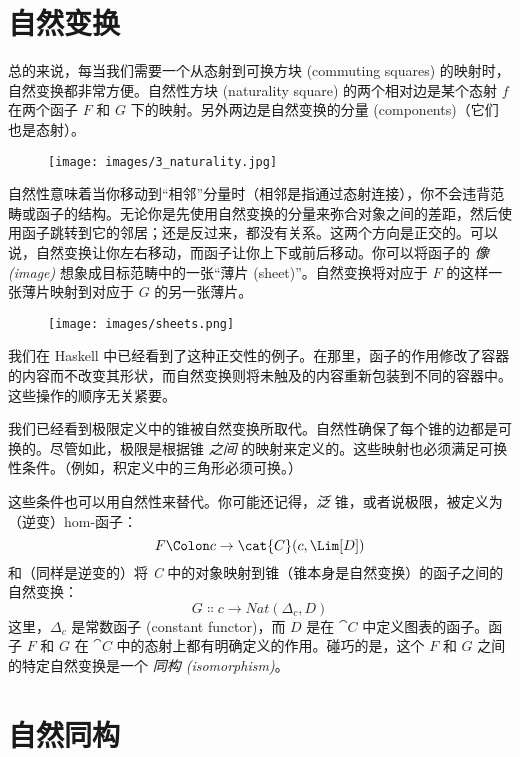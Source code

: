 \section{自然变换}

总的来说，每当我们需要一个从态射到可换方块 (commuting squares) 的映射时，自然变换都非常方便。自然性方块 (naturality square) 的两个相对边是某个态射 $f$ 在两个函子 $F$ 和 $G$ 下的映射。另外两边是自然变换的分量 (components)（它们也是态射）。

\begin{figure}[H]
  \centering
  \texttt{[image: images/3\_naturality.jpg]}
\end{figure}

\noindent
自然性意味着当你移动到“相邻”分量时（相邻是指通过态射连接），你不会违背范畴或函子的结构。无论你是先使用自然变换的分量来弥合对象之间的差距，然后使用函子跳转到它的邻居；还是反过来，都没有关系。这两个方向是正交的。可以说，自然变换让你左右移动，而函子让你上下或前后移动。你可以将函子的 \emph{像 (image)} 想象成目标范畴中的一张“薄片 (sheet)”。自然变换将对应于 $F$ 的这样一张薄片映射到对应于 $G$ 的另一张薄片。

\begin{figure}[H]
  \centering
  \texttt{[image: images/sheets.png]}
\end{figure}

\noindent
我们在 Haskell 中已经看到了这种正交性的例子。在那里，函子的作用修改了容器的内容而不改变其形状，而自然变换则将未触及的内容重新包装到不同的容器中。这些操作的顺序无关紧要。

我们已经看到极限定义中的锥被自然变换所取代。自然性确保了每个锥的边都是可换的。尽管如此，极限是根据锥 \emph{之间} 的映射来定义的。这些映射也必须满足可换性条件。（例如，积定义中的三角形必须可换。）

这些条件也可以用自然性来替代。你可能还记得，\emph{泛} 锥，或者说极限，被定义为（逆变）hom-函子：
\[F \Colon c \to \cat{C}(c, \Lim[D])\]
和（同样是逆变的）将 \emph{C} 中的对象映射到锥（锥本身是自然变换）的函子之间的自然变换：
\[G \Colon c \to \mathit{Nat}(\Delta_c, D)\]
这里，$\Delta_c$ 是常数函子 (constant functor)，而 $D$ 是在 $\cat{C}$ 中定义图表的函子。函子 $F$ 和 $G$ 在 $\cat{C}$ 中的态射上都有明确定义的作用。碰巧的是，这个 $F$ 和 $G$ 之间的特定自然变换是一个 \emph{同构 (isomorphism)}。

\section{自然同构}

